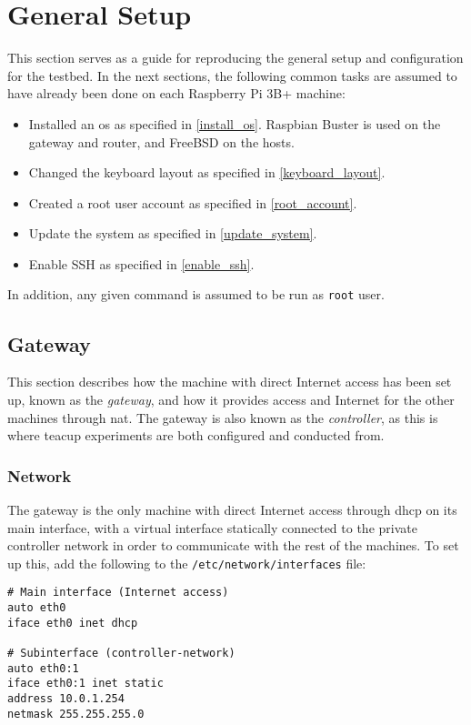 \section{General Setup}

This section serves as a guide for reproducing the general setup and configuration for the testbed. In the next sections, the following common tasks are assumed to have already been done on each Raspberry Pi 3B+ machine:

\begin{itemize}
    \item Installed an \gls{os} as specified in \ref{install_os}. Raspbian Buster is used on the gateway and router, and FreeBSD on the hosts.
    \item Changed the keyboard layout as specified in \ref{keyboard_layout}.
    \item Created a root user account as specified in \ref{root_account}.
    \item Update the system as specified in \ref{update_system}.
    \item Enable SSH as specified in \ref{enable_ssh}.
\end{itemize}

In addition, any given command is assumed to be run as \lstinline{root} user.

\subsection{Gateway}

This section describes how the machine with direct Internet access has been set up, known as the \textit{gateway}, and how it provides access and Internet for the other machines through \gls{nat}. The gateway is also known as the \textit{controller}, as this is where \gls{teacup} experiments are both configured and conducted from.


\subsubsection{Network}

The gateway is the only machine with direct Internet access through \gls{dhcp} on its main interface, with a virtual interface statically connected to the private controller network in order to communicate with the rest of the machines. To set up this, add the following to the \lstinline{/etc/network/interfaces} file:

\begin{verbatim}
# Main interface (Internet access)
auto eth0
iface eth0 inet dhcp

# Subinterface (controller-network)
auto eth0:1
iface eth0:1 inet static
address 10.0.1.254
netmask 255.255.255.0
\end{verbatim}

